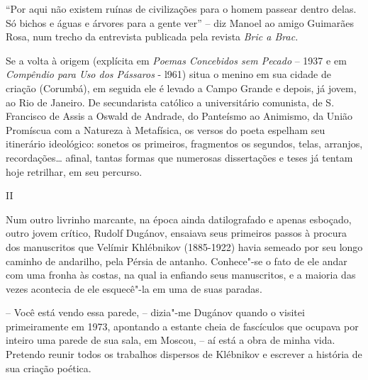 ``Por aqui não existem ruínas de civilizações para o homem passear
dentro delas. Só bichos e águas e árvores para a gente ver'' -- diz
Manoel ao amigo Guimarães Rosa, num trecho da entrevista publicada pela
revista \emph{Bric a Brac.}

Se a volta à origem (explícita em \emph{Poemas Concebidos sem Pecado} --
1937 e em \emph{Compêndio para Uso dos Pássaros} - l961) situa o menino
em sua cidade de criação (Corumbá), em seguida ele é levado a Campo
Grande e depois, já jovem, ao Rio de Janeiro. De secundarista católico a
universitário comunista, de S. Francisco de Assis a Oswald de Andrade,
do Panteísmo ao Animismo, da União Promíscua com a Natureza à
Metafísica, os versos do poeta espelham seu itinerário ideológico:
sonetos os primeiros, fragmentos os segundos, telas, arranjos,
recordações\ldots{} afinal, tantas formas que numerosas dissertações e teses
já tentam hoje retrilhar, em seu percurso.

II

Num outro livrinho marcante, na época ainda datilografado e apenas
esboçado, outro jovem crítico, Rudolf Dugánov, ensaiava seus primeiros
passos à procura dos manuscritos que Velímir Khlébnikov (1885-1922)
havia semeado por seu longo caminho de andarilho, pela Pérsia de
antanho. Conhece"-se o fato de ele andar com uma fronha às costas, na
qual ia enfiando seus manuscritos, e a maioria das vezes acontecia de
ele esquecê"-la em uma de suas paradas.

-- Você está vendo essa parede, -- dizia"-me Dugánov quando o visitei
primeiramente em 1973, apontando a estante cheia de fascículos que
ocupava por inteiro uma parede de sua sala, em Moscou, -- aí está a obra
de minha vida. Pretendo reunir todos os trabalhos dispersos de Klébnikov
e escrever a história de sua criação poética.

